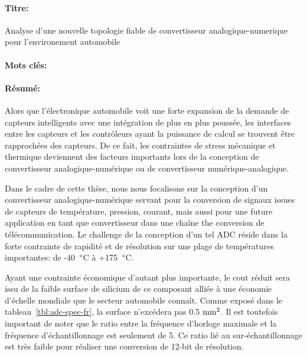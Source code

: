 \begin{mdframed}[linecolor=Prune,linewidth=1]
\vspace{-.25cm}
\paragraph*{Titre:} 
Analyse d'une nouvelle topologie fiable de convertisseur analogique-numerique pour \newline l'environement automobile
\vspace{-.25cm}
\paragraph*{Mots clés:} 

\vspace{-.5cm}
\paragraph*{Résumé:} 
Alors que l'électronique automobile voit une forte expansion de la demande de capteurs intelligents avec une intégration de plus en plus poussée, les interfaces entre les capteurs et les contrôleurs ayant la puissance de calcul se trouvent être rapprochées des capteurs. De ce fait, les contraintes de stress mécanique et thermique deviennent des facteurs importants lors de la conception de convertisseur analogique-numérique ou de convertisseur numérique-analogique.

Dans le cadre de cette thèse, nous nous focalisons sur la conception d'un convertisseur analogique-numérique servant pour la conversion de signaux issues de capteurs de température, pression, courant, mais aussi pour une future application en tant que convertisseur dans une chaîne the conversion de télécommunication. Le challenge de la conception d'un tel ADC réside dans la forte contrainte de rapidité et de résolution sur une plage de températures importantes: de -40 $\degree$C à +175 $\degree$C.

Ayant une contrainte économique d’autant plus importante, le cout réduit sera issu de la faible surface de silicium de ce composant alliée à une économie d’échelle mondiale que le secteur automobile connaît. Comme exposé dans le tableau~\ref{tbl:adc-spec-fr}, la surface n’excédera pas 0.5 $\rm mm^2$. Il est toutefois important de noter que le ratio entre la fréquence d'horloge maximale et la fréquence d'échantillonnage est seulement de 5. Ce ratio lié au sur-échantillonnage est très faible pour réaliser une conversion de 12-bit de résolution.


\end{mdframed}
